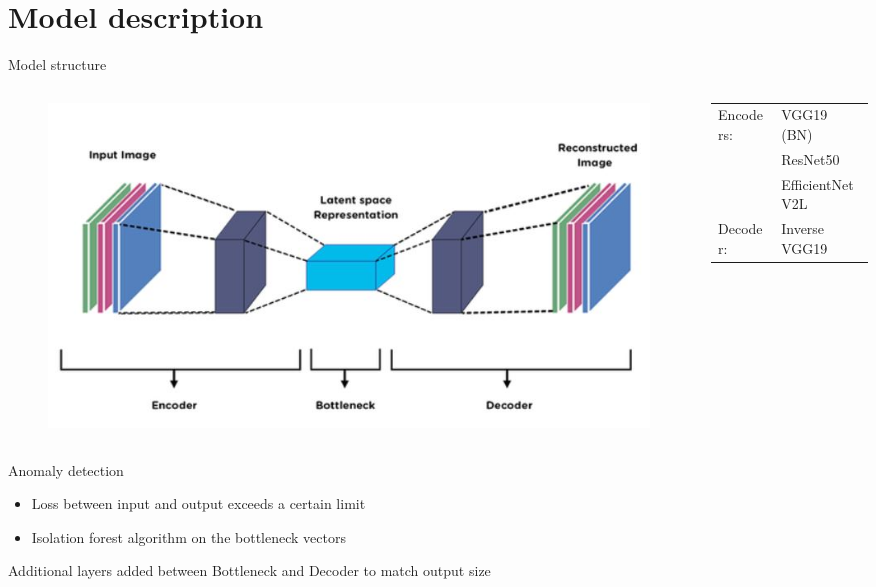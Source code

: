 \documentclass[aspectratio=169]{beamer}
\begin{document}
\section{Model description}
\begin{frame}[t]{Model structure}
    \begin{columns}[c]
        \begin{column}{0.45\textwidth}
            \begin{figure}[t]
                \centering
                \includegraphics[width=\columnwidth,trim={0 0 0 1cm},clip]{./tex_images/autoencoder.jpeg}
            \end{figure}
        \end{column}
        \begin{column}{0.45\textwidth}
            \begin{tabular}{l l}
                Encoders: & VGG19 (BN)      \\
                          & ResNet50        \\
                          & EfficientNetV2L \\
                Decoder:  & Inverse VGG19   \\
            \end{tabular}
        \end{column}
    \end{columns}

    \pause
    \vspace*{\fill}
    Anomaly detection
    \begin{itemize}
        \item Loss between input and output exceeds a certain limit
        \item Isolation forest algorithm on the bottleneck vectors
    \end{itemize}

    Additional layers added between Bottleneck and Decoder to match output size
\end{frame}
\end{document}
